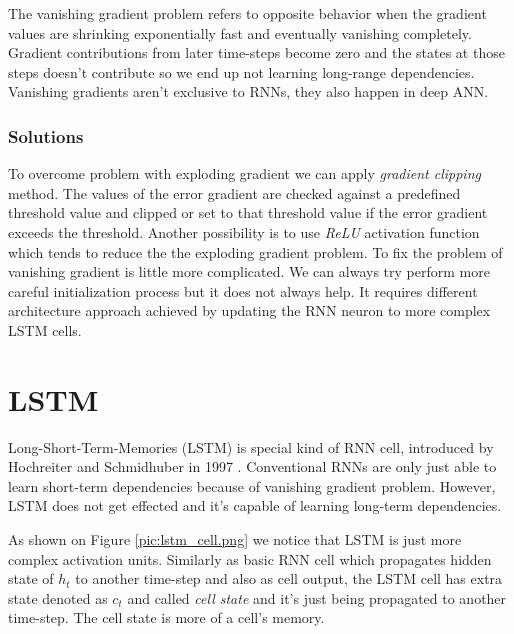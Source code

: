 The vanishing gradient problem refers to opposite behavior when the gradient values are shrinking exponentially fast and eventually vanishing completely.
Gradient contributions from later time-steps become zero and the states at those steps doesn’t contribute so we end up not learning long-range dependencies.
Vanishing gradients aren’t exclusive to RNNs, they also happen in deep ANN\cite{existence_gradient}.

\subsubsection{Solutions}

To overcome problem with exploding gradient we can apply \textit{gradient clipping} method.
The values of the error gradient are checked against a predefined threshold value and clipped or set to that threshold value if the error gradient exceeds the threshold\cite{gradient_cliping}.
Another possibility is to use \textit{ReLU} activation function which tends to reduce the the exploding gradient problem.
To fix the problem of vanishing gradient is little more complicated.
We can always try perform more careful initialization process but it does not always help.
It requires different architecture approach achieved by updating the RNN neuron to more complex LSTM cells.

\section{LSTM}

Long-Short-Term-Memories (LSTM) is special kind of RNN cell, introduced by Hochreiter and Schmidhuber in 1997 \cite{lstm}.
Conventional RNNs are only just able to learn short-term dependencies because of vanishing gradient problem.
However, LSTM does not get effected and it's capable of learning long-term dependencies.


As shown on Figure \ref{pic:lstm_cell.png} we notice that LSTM is just more complex activation units.
Similarly as basic RNN cell which propagates hidden state of $h_t$ to another time-step and also as cell output, the LSTM cell has extra state denoted as $c_t$ and called \textit{cell state} and it's just being propagated to another time-step.
The cell state is more of a cell's memory.

